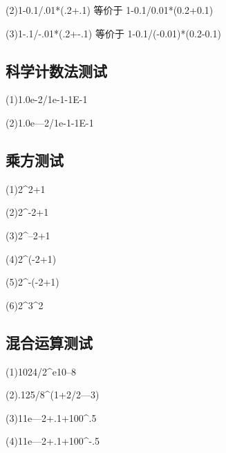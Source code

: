 \documentclass[UTF8]{ctexart}
\begin{document}
(2)1-0.1/.01*(.2+.1) 等价于 1-0.1/0.01*(0.2+0.1)

(3)1-.1/-.01*(.2+-.1) 等价于 1-0.1/(-0.01)*(0.2-0.1)


\subsection{科学计数法测试}
(1)1.0e-2/1e-1-1E-1

(2)1.0e---2/1e-1-1E-1

\subsection{乘方测试}
(1)2\textasciicircum2+1

(2)2\textasciicircum-2+1

(3)2\textasciicircum--2+1

(4)2\textasciicircum(-2+1)

(5)2\textasciicircum-(-2+1)

(6)2\textasciicircum3\textasciicircum2

\subsection{混合运算测试}
(1)1024/2\textasciicircum e10--8

(2).125/8\textasciicircum(1+2/2---3)

(3)11e---2+.1+100\textasciicircum.5

(4)11e---2+.1+100\textasciicircum-.5
\end{document}
